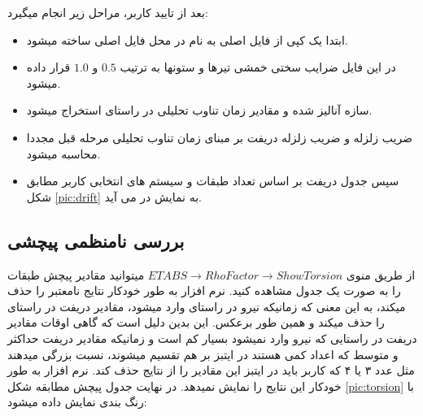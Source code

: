 بعد از تایید کاربر، مراحل زیر انجام میگیرد:
\begin{itemize}
    \item ابتدا یک کپی از فایل اصلی به نام  در محل فایل اصلی ساخته میشود.
    \item در این فایل ضرایب سختی خمشی تیرها و ستونها به ترتیب $0.5$ و $1.0$ قرار داده میشود.
    \item سازه آنالیز شده و مقادیر زمان تناوب تحلیلی در راستای  استخراج میشود.
    \item ضریب زلزله و ضریب زلزله دریفت بر مبنای زمان تناوب تحلیلی مرحله قبل مجددا محاسبه میشود.
    \item سپس جدول دریفت بر اساس تعداد طبقات و سیستم های انتخابی کاربر مطابق شکل \ref{pic:drift} به نمایش در می آید.
\end{itemize}

\subsection{بررسی نامنظمی پیچشی}
از طریق منوی 
$ETABS \rightarrow Rho Factor \rightarrow Show Torsion$
میتوانید مقادیر پیچش طبقات را به صورت یک جدول مشاهده کنید. نرم افزار به طور خودکار نتایج نامعتبر را حذف میکند، به این معنی که زمانیکه نیرو در راستای 
وارد میشود، مقادیر دریفت در راستای  را حذف میکند و همین طور برعکس. این بدین دلیل است که گاهی اوقات مقادیر دریفت در راستایی که نیرو وارد نمیشود
بسیار کم است و زمانیکه مقادیر دریفت حداکثر و متوسط که اعداد کمی هستند در ایتبز بر هم تقسیم میشوند،‌ نسبت بزرگی میدهند مثل عدد ۳ یا ۴ که کاربر باید در ایتبز این
مقادیر را از نتایج حذف کند. نرم افزار به طور خودکار این نتایج را نمایش نمیدهد. در نهایت جدول پیچش مطابقه شکل 
\ref{pic:torsion}
با رنگ بندی نمایش داده میشود:

